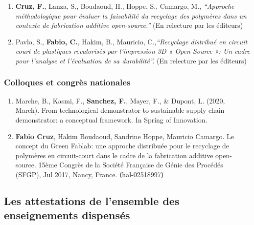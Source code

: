 \documentclass[
  11pt,
]{article}
\begin{document}
\begin{enumerate}
\def\labelenumi{\arabic{enumi}.}
\item
  \textbf{Cruz, F.}, Lanza, S., Boudaoud, H., Hoppe, S., Camargo, M.,
  \emph{``Approche méthodologique pour évaluer la faisabilité du
  recyclage des polymères dans un contexte de fabrication additive
  open-source.''} (En relecture par les éditeurs)
\item
  Pavlo, S., \textbf{Fabio, C.}, Hakim, B., Mauricio,
  C.,\emph{``Recyclage distribué en circuit court de plastiques
  revalorisés par l'impression 3D « Open Source »: Un cadre pour
  l'analyse et l'évaluation de sa durabilité''.} (En relecture par les
  éditeurs)
\end{enumerate}

\hypertarget{colloques-et-congruxe8s-nationales}{%
\subsubsection{Colloques et congrès
nationales}\label{colloques-et-congruxe8s-nationales}}

\begin{enumerate}
\def\labelenumi{\arabic{enumi}.}
\item
  Marche, B., Kasmi, F., \textbf{Sanchez, F.}, Mayer, F., \& Dupont, L.
  (2020, March). From technological demonstrator to sustainable supply
  chain demonstrator: a conceptual framework. In Spring of Innovation.
\item
  \textbf{Fabio Cruz}, Hakim Boudaoud, Sandrine Hoppe, Mauricio Camargo.
  Le concept du Green Fablab: une approche distribuée pour le recyclage
  de polymères en circuit-court dans le cadre de la fabrication additive
  open-source. 15ème Congrès de la Société Française de Génie des
  Procédés (SFGP), Jul 2017, Nancy, France. ⟨hal-02518997⟩
\end{enumerate}

\newpage

\hypertarget{les-attestations-de-lensemble-des-enseignements-dispensuxe9s}{%
\subsection{Les attestations de l'ensemble des enseignements
dispensés}\label{les-attestations-de-lensemble-des-enseignements-dispensuxe9s}}


\end{document}
